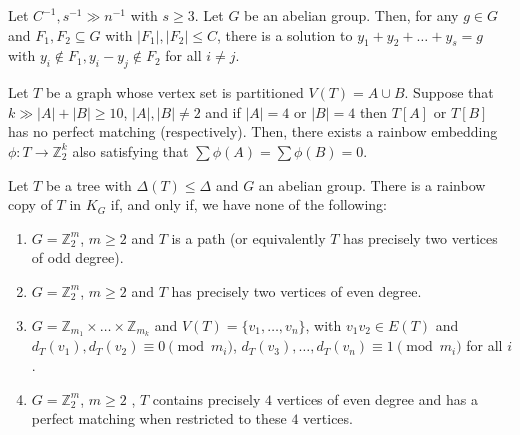 \documentclass[10pt,a4paper]{amsart}
\begin{document}
\begin{lemma}\label{Lemma_y1y2...ys_separate}
Let $C^{-1}, s^{-1}\gg n^{-1}$ with $s\geq 3$.
Let $G$ be an abelian group. Then, for any $g\in G$ and $F_1, F_2\subseteq G$ with $|F_1|, |F_2|\leq C$, there is a solution to $y_1+y_2+\dots+y_s=g$ with $y_i\not\in F_1, y_{i}-y_j\not\in F_2$ for all $i\neq j$.
\end{lemma}

\begin{lemma}\label{Lemma_zero_sum_sets_Z2k}
Let $T$ be a graph whose vertex set is partitioned $V(T)=A\cup B$. Suppose that $k\gg |A|+|B|\ge 10$, $|A|, |B|\ne 2$ and if $|A|=4$ or $|B|=4$ then $T[A]$ or $T[B]$ has no perfect matching (respectively). Then, there exists a rainbow embedding $\phi: T \to \mathbb{Z}_2^k$ also satisfying that $\sum \phi(A)=\sum \phi(B)=0$.
\end{lemma}

\begin{theorem}\label{Theorem_harmonious_tree_characterization}
Let $T$ be a tree with $\Delta(T)\leq \Delta$  and $G$ an abelian group. There is a rainbow copy of $T$ in $K_G$ if, and only if, we have none of the following:
\begin{enumerate}[(1)]
\item $G=\mathbb{Z}_2^m$, $m\geq 2$  and  $T$ is a path (or equivalently $T$ has precisely two vertices of odd degree).
\item $G=\mathbb{Z}_2^m$, $m\geq 2$  and  $T$ has precisely two vertices of even degree.
\item $G=\mathbb{Z}_{m_1}\times\dots \times \mathbb{Z}_{m_k}$ and $V(T)=\{v_1, \dots, v_n\}$, with $v_1v_2\in E(T)$ and  $d_T(v_1), d_T(v_2)\equiv 0\pmod {m_i}$, $d_T(v_3), \dots, d_T(v_n)\equiv 1\pmod {m_i}$ for all $i$.
\item $G=\mathbb{Z}_2^m$, $m\geq 2$ , $T$ contains precisely $4$ vertices of  even degree and has a perfect matching when restricted to these $4$ vertices.
\end{enumerate}
\end{theorem}
\end{document}
